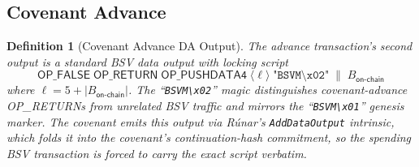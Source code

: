 \documentclass[11pt,a4paper]{article}
\newtheorem{definition}{Definition}[section]
\begin{document}
\subsection{Covenant Advance}

\begin{definition}[Covenant Advance DA Output]\label{def:da-output}
The advance transaction's second output is a standard BSV data output with locking script
\[
    \mathsf{OP\_FALSE}\;\mathsf{OP\_RETURN}\;\mathsf{OP\_PUSHDATA4}\;\langle \ell \rangle\;\texttt{"BSVM\textbackslash x02"}\;\| \;B_{\mathsf{on\text{-}chain}}
\]
where $\ell = 5 + |B_{\mathsf{on\text{-}chain}}|$. The ``\texttt{BSVM\textbackslash x02}'' magic distinguishes covenant-advance OP\_RETURNs from unrelated BSV traffic and mirrors the ``\texttt{BSVM\textbackslash x01}'' genesis marker. The covenant emits this output via R\'{u}nar's \texttt{AddDataOutput} intrinsic, which folds it into the covenant's continuation-hash commitment, so the spending BSV transaction is forced to carry the exact script verbatim.
\end{definition}
\end{document}

